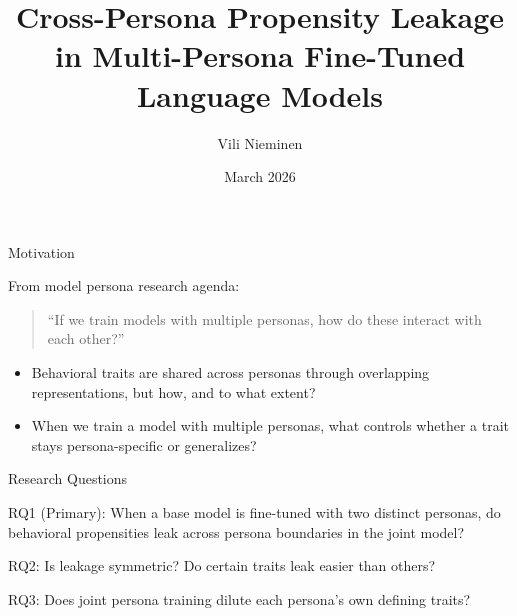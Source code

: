 \documentclass[aspectratio=169,11pt]{beamer}
\title{Cross-Persona Propensity Leakage\\in Multi-Persona Fine-Tuned Language Models}
\author{Vili Nieminen}
\date{March 2026}
\begin{document}
\begin{frame}
	\titlepage
\end{frame}

\begin{frame}{Motivation}

	From model persona research agenda:

	\vspace{1.5em}

	\begin{quote}
		``If we train models with multiple personas, how do these interact with each other?''
	\end{quote}

	\vspace{0.5em}

	\begin{itemize}
		\item Behavioral traits are shared across personas through overlapping representations, but how, and to what extent?
		\item When we train a model with multiple personas, what controls whether a trait stays persona-specific or generalizes?
	\end{itemize}

\end{frame}

\begin{frame}{Research Questions}

	RQ1 (Primary): When a base model is fine-tuned with two distinct personas, do behavioral propensities leak across persona boundaries in the joint model?

	\vspace{1em}

	RQ2: Is leakage symmetric? Do certain traits leak easier than others?

	\vspace{1em}

	RQ3: Does joint persona training dilute each persona's own defining traits?

\end{frame}
\end{document}
